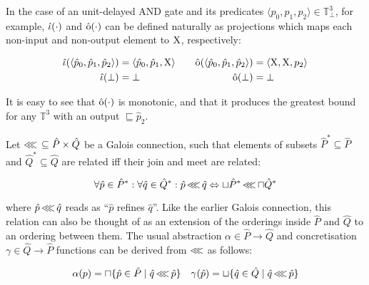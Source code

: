 
In the case of an unit-delayed AND gate and its predicates $\langle p_{0}, p_{1}, p_{2} \rangle \in \mathbb{T}_{\bot}^{3}$, for example, $\operatorname{\hat{\iota}}(\cdot)$ and $\operatorname{\hat{\mathrm{o}}}(\cdot)$ can be defined naturally as projections which maps each non-input and non-output element to $\mathrm{X}$, respectively:

\begin{equation*}
\begin{aligned}[t]
\operatorname{\hat{\iota}}(\langle \hat p_{0}, \hat p_{1}, \hat p_{2} \rangle) &= \langle \hat p_{0}, \hat p_{1}, \mathrm{X} \rangle \\
\operatorname{\hat{\iota}}(\bot) &= \bot
\end{aligned}
\qquad
\begin{aligned}[t]
\operatorname{\hat{\mathrm{o}}}(\langle \hat p_{0}, \hat p_{1}, \hat p_{2} \rangle) &= \langle \mathrm{X}, \mathrm{X}, p_{2} \rangle \\
\operatorname{\hat{\mathrm{o}}}(\bot) &= \bot
\end{aligned}
\end{equation*}

\noindent It is easy to see that $\operatorname{\hat{\mathrm{o}}}(\cdot)$ is monotonic, and that it produces the greatest bound for any $\mathbb{T}^{3}$ with an output $\sqsubseteq \hat p_{2}$.

Let $\operatorname{\lll} \, \subseteq \hat P \times \hat Q$ be a Galois connection, such that elements of subsets $\hat P^{*} \subseteq \hat P$ and $\hat Q^{*} \subseteq \hat Q$ are related iff their join and meet are related:

\begin{equation*}
\forall \hat p \in \hat P^{*} : \forall \hat q \in \hat Q^{*} : \hat p \operatorname{\lll} \hat q \Leftrightarrow \sqcup \hat P^{*} \operatorname{\lll} \sqcap \hat Q^{*}
\end{equation*}

\noindent where $\hat p \operatorname{\lll} \hat q$ reads as ``$\hat p$ refines $\hat q$''. Like the earlier Galois connection, this relation can also be thought of as an extension of the orderings inside $\hat P$ and $\hat Q$ to an ordering between them. The usual abstraction $\alpha \in \hat P \rightarrow \hat Q$ and concretisation $\gamma \in \hat Q \rightarrow \hat P$ functions can be derived from $\operatorname{\lll}$ as follows:

\begin{align*}
\alpha(p) = \sqcap \{ \hat p \in \hat P \mid \hat q \operatorname{\lll} \hat p \} && \gamma(\hat p) = \sqcup \{ \hat q \in \hat Q \mid \hat q \operatorname{\lll} \hat p \}
\end{align*}

